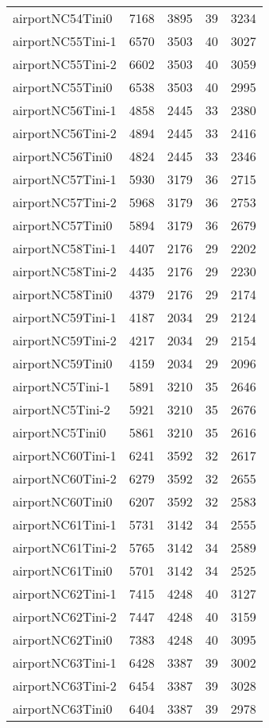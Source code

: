 \documentclass[../../../thesis.tex]{subfiles}
\begin{document}
\begin{longtable}{lrrrr}
airportNC54Tini0 & 7168 & 3895 & 39 & 3234 \\
airportNC55Tini-1 & 6570 & 3503 & 40 & 3027 \\
airportNC55Tini-2 & 6602 & 3503 & 40 & 3059 \\
airportNC55Tini0 & 6538 & 3503 & 40 & 2995 \\
airportNC56Tini-1 & 4858 & 2445 & 33 & 2380 \\
airportNC56Tini-2 & 4894 & 2445 & 33 & 2416 \\
airportNC56Tini0 & 4824 & 2445 & 33 & 2346 \\
airportNC57Tini-1 & 5930 & 3179 & 36 & 2715 \\
airportNC57Tini-2 & 5968 & 3179 & 36 & 2753 \\
airportNC57Tini0 & 5894 & 3179 & 36 & 2679 \\
airportNC58Tini-1 & 4407 & 2176 & 29 & 2202 \\
airportNC58Tini-2 & 4435 & 2176 & 29 & 2230 \\
airportNC58Tini0 & 4379 & 2176 & 29 & 2174 \\
airportNC59Tini-1 & 4187 & 2034 & 29 & 2124 \\
airportNC59Tini-2 & 4217 & 2034 & 29 & 2154 \\
airportNC59Tini0 & 4159 & 2034 & 29 & 2096 \\
airportNC5Tini-1 & 5891 & 3210 & 35 & 2646 \\
airportNC5Tini-2 & 5921 & 3210 & 35 & 2676 \\
airportNC5Tini0 & 5861 & 3210 & 35 & 2616 \\
airportNC60Tini-1 & 6241 & 3592 & 32 & 2617 \\
airportNC60Tini-2 & 6279 & 3592 & 32 & 2655 \\
airportNC60Tini0 & 6207 & 3592 & 32 & 2583 \\
airportNC61Tini-1 & 5731 & 3142 & 34 & 2555 \\
airportNC61Tini-2 & 5765 & 3142 & 34 & 2589 \\
airportNC61Tini0 & 5701 & 3142 & 34 & 2525 \\
airportNC62Tini-1 & 7415 & 4248 & 40 & 3127 \\
airportNC62Tini-2 & 7447 & 4248 & 40 & 3159 \\
airportNC62Tini0 & 7383 & 4248 & 40 & 3095 \\
airportNC63Tini-1 & 6428 & 3387 & 39 & 3002 \\
airportNC63Tini-2 & 6454 & 3387 & 39 & 3028 \\
airportNC63Tini0 & 6404 & 3387 & 39 & 2978 \\

\end{longtable}
\end{document}
